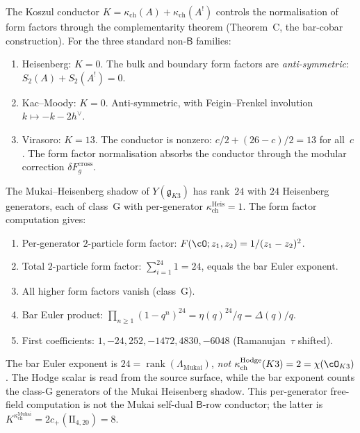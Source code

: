 \begin{remark}
\label{rem:conductor-ff-normalisation}
The Koszul conductor $K = \kappa_{\mathrm{ch}}(A) + \kappa_{\mathrm{ch}}(A^!)$ controls the normalisation of form factors through the complementarity theorem (Theorem~C, the bar-cobar construction). For the three standard non-$\mathsf{B}$ families:
\begin{enumerate}[label=(\alph*)]
 \item Heisenberg: $K = 0$. The bulk and boundary form factors are \emph{anti-symmetric}: $S_2(A) + S_2(A^!) = 0$.
 \item Kac--Moody: $K = 0$. Anti-symmetric, with Feigin--Frenkel involution $k \mapsto -k - 2h^\vee$.
 \item Virasoro: $K = 13$. The conductor is nonzero: $c/2 + (26-c)/2 = 13$ for all~$c$. The form factor normalisation absorbs the conductor through the modular correction $\delta F_g^{\mathrm{cross}}$.
\end{enumerate}
\end{remark}

\begin{proposition}
\label{prop:k3-bar-euler-ff}
The Mukai--Heisenberg shadow of $Y(\mathfrak{g}_{K3})$ has rank~$24$ with $24$ Heisenberg generators, each of class~G with per-generator $\kappa_{\mathrm{ch}}^{\mathrm{Heis}} = 1$. The form factor computation gives:
\begin{enumerate}[label=(\roman*)]
 \item Per-generator $2$-particle form factor: $F(\cO; z_1, z_2) = 1/(z_1 - z_2)^2$.
 \item Total $2$-particle form factor: $\sum_{i=1}^{24} 1 = 24$, equals the bar Euler exponent.
 \item All higher form factors vanish \textup{(}class~G\textup{)}.
 \item Bar Euler product: $\prod_{n \geq 1} (1 - q^n)^{24} = \eta(q)^{24}/q = \Delta(q)/q$.
 \item First coefficients: $1, -24, 252, -1472, 4830, -6048$ \textup{(}Ramanujan~$\tau$ shifted\textup{)}.
\end{enumerate}
The bar Euler exponent is $24 = \operatorname{rank}(\Lambda_{\mathrm{Mukai}})$, \emph{not} $\kappa_{\mathrm{ch}}^{\mathrm{Hodge}}(K3) = 2 = \chi(\cO_{K3})$. The Hodge scalar is read from the source surface, while the bar exponent counts the class-G generators of the Mukai Heisenberg shadow. This per-generator free-field computation is not the Mukai self-dual $\mathsf{B}$-row conductor; the latter is $K^{\kappa_{\mathrm{ch}}^{\mathrm{Mukai}}}=2c_+(\mathrm{II}_{4,20})=8$.
\end{proposition}


